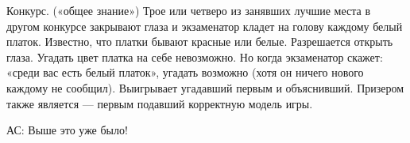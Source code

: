 \begin{problem}
 Конкурс. («общее знание») Трое или четверо из
занявших лучшие места в другом конкурсе закрывают
глаза и экзаменатор кладет на голову каждому белый
платок. Известно, что платки бывают красные или
белые. Разрешается открыть глаза. Угадать цвет
платка на себе невозможно. Но когда экзаменатор
скажет: «среди вас есть белый платок», угадать
возможно (хотя он ничего нового каждому не
сообщил). Выигрывает угадавший первым и объяснивший.
Призером также является — первым подавший
корректную модель игры.


{\red АС:  Выше это уже было!}


\begin{sol}

\end{sol}
\end{problem}
